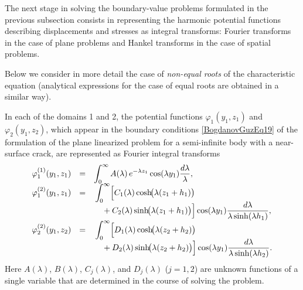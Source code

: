 The next stage in solving the boundary-value problems formulated in the previous subsection consists in representing the harmonic potential functions describing displacements and stresses as integral transforms: Fourier transforms in the case of plane problems and Hankel transforms in the case of spatial problems. 

Below we consider in more detail the case of \textit{non-equal roots} of the characteristic equation (analytical expressions for the case of equal roots are obtained in a similar way).

In each of the domains 1 and 2, the potential functions $\varphi_{1}(y_{1},z_{1})$ and $\varphi_{2}(y_{1},z_{2})$, which appear in the boundary conditions \eqref{BogdanovGuzEq19} of the formulation of the plane linearized problem for a semi-infinite body with a near-surface crack, are represented as Fourier integral transforms~\cite{BogdanovGuz58}
\begin{equation}
	\label{BogdanovGuzEq26}
	\begin{array}{rcl}
		\varphi_{1}^{(1)}(y_{1},z_{1})&=&\displaystyle
		\int_{0}^{\infty}
		A(\lambda)\,
		e^{-\lambda z_{1}}
		\cos(\lambda y_{1})
		\frac{d\lambda}{\lambda},
		\\
			\varphi_{1}^{(2)}(y_{1},z_{1})
		&=&
		\begin{multlined}[t]			
			\displaystyle
			\int_{0}^{\infty}
			\Bigl[ C_{1}(\lambda)\cosh\!\bigl(\lambda(z_{1}+h_{1})\bigr) \\
			\\[-3em] 
			+ C_{2}(\lambda)\sinh\!\bigl(\lambda(z_{1}+h_{1})\bigr)
			\Bigr]
			\cos(\lambda y_{1})
			\frac{d\lambda}{\lambda\sinh(\lambda h_{1})},
		\end{multlined}
		\\
		\varphi_{2}^{(2)}(y_{1},z_{2})
		&=&
		\begin{multlined}[t]
			\displaystyle
			\int_{0}^{\infty}
			\Bigl[
			 D_{1}(\lambda)\cosh\!\bigl(\lambda(z_{2}+h_{2})\bigr) \\
			\\[-3em] 
			 + D_{2}(\lambda)\sinh\!\bigl(\lambda(z_{2}+h_{2})\bigr)
			\Bigr]
			\cos(\lambda y_{1})
			\frac{d\lambda}{\lambda\sinh(\lambda h_{2})}.
		\end{multlined}
	\end{array}
\end{equation}
%
Here $A(\lambda)$, $B(\lambda)$, $C_{j}(\lambda)$, and $D_{j}(\lambda)$ ($j=1,2$) are unknown functions of a single variable that are determined in the course of solving the problem. 


